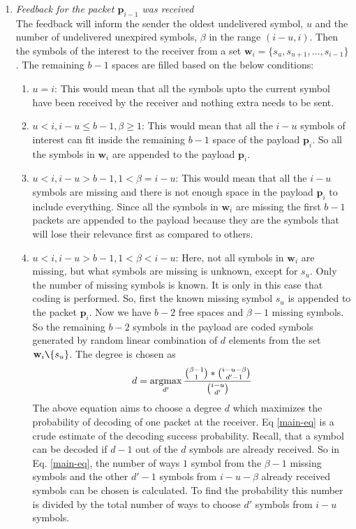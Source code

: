 \begin{enumerate}
	\item \textit{Feedback for the packet $\mathbf{p}_{i-1}$ was  received}\\
		The feedback will inform the sender the oldest undelivered symbol, $u$ and the number of undelivered unexpired symbols, $\beta$ in the range $(i-u, i)$. Then the symbols of the interest to the receiver from a set $\mathbf{w}_i = \{s_u, s_{u+1},..., s_{i-1}\}$. The remaining $b - 1$ spaces are filled based on the below conditions:
		\begin{enumerate}
			\item $u = i$: This would mean that all the symbols upto the current symbol have been received by the receiver and nothing extra needs to be sent.
			\item $u < i, i-u \leq b-1, \beta \geq 1$: This would mean that all the $i-u$ symbols of interest can fit inside the remaining $b-1$ space of the payload $\mathbf{p}_i$. So all the symbols in $\mathbf{w}_i$ are appended to the payload $\mathbf{p}_i$.
			\item $u < i, i-u > b-1, 1<\beta = i-u$: This would mean that all the $i-u$ symbols are missing and there is not enough space in the payload $\mathbf{p}_i$ to include everything. Since all the symbols in $\mathbf{w}_i$ are missing the first $b-1$ packets are appended to the payload because they are the symbols that will lose their relevance first as compared to others.
			\item $u < i, i-u > b-1, 1<\beta < i-u$: Here, not all symbols in $\mathbf{w}_i$ are missing, but what symbols are missing is unknown, except for $s_u$. Only the number of missing symbols is known. It is only in this case that coding is performed. So, first the known missing symbol $s_u$ is appended to the packet $\mathbf{p}_i$. Now we have $b-2$ free spaces and $\beta-1$ missing symbols. So the remaining $b-2$ symbols in the payload are coded symbols generated by random linear combination of $d$ elements from the set $\mathbf{w}_i \texttt{\char`\\} \{s_u\}$. The degree is chosen as
			\begin{equation}
				d = \operatorname*{argmax}_{d'} \frac{\binom{\beta - 1}{1}*\binom{i-u-\beta}{d'-1}}{\binom{i-u}{d'}}
				\label{main-eq}
			\end{equation}
			The above equation aims to choose a degree $d$ which maximizes the probability of decoding of one packet at the receiver. Eq \ref{main-eq} is a crude estimate of the decoding success probability. Recall, that a symbol can be decoded if $d-1$ out of the $d$ symbols are already received. So in Eq. \ref{main-eq}, the number of ways $1$ symbol from the $\beta-1$ missing symbols and the other $d'-1$ symbols from $i-u-\beta$ already received symbols can be chosen is calculated. To find the probability this number is divided by the total number of ways to choose $d'$ symbols from $i-u$ symbols.

\end{enumerate}
\end{enumerate}
